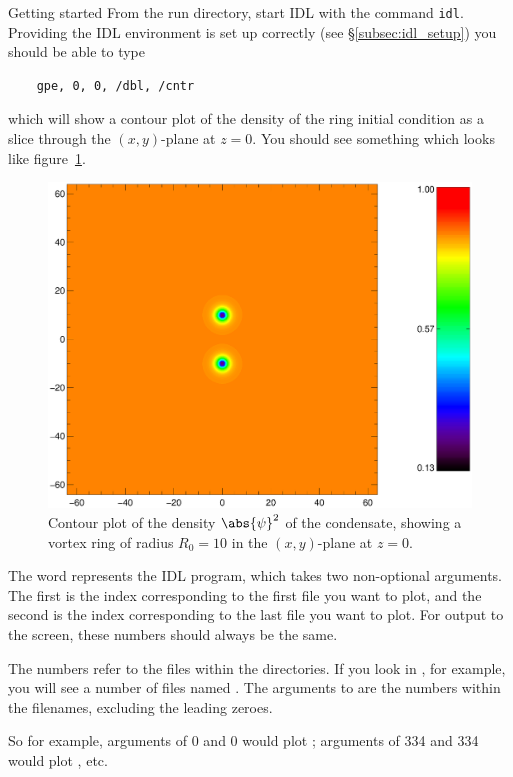 \begin{chapter}{\label{cha:quickstart}Getting started}
  From the run directory, start IDL with the command \verb"idl".  Providing the
  IDL environment is set up correctly (see \S\ref{subsec:idl_setup}) you
  should be able to type
  \begin{Verbatim}
    gpe, 0, 0, /dbl, /cntr
  \end{Verbatim}
  which will show a contour plot of the density of the ring initial condition
  as a slice through the $(x,y)$-plane at $z=0$.  You should see something
  which looks like figure~\ref{fig:ring_ic_con}.
  \begin{figure}[h]
    \centering
    \includegraphics[scale=0.5]{fig/ring_ic_con}
    \caption{\label{fig:ring_ic_con}Contour plot of the density
      $\abs{\psi}^{2}$ of the condensate, showing a vortex ring of radius
      $R_{0}=10$ in the $(x,y)$-plane at $z=0$.}
  \end{figure}
  
  The word  represents the IDL program, which takes two
  non-optional arguments.  The first is the index corresponding to the first
  file you want to plot, and the second is the index corresponding to the last
  file you want to plot.  For output to the screen, these numbers should always
  be the same.

  The numbers refer to the files within the  directories.  If you
  look in , for example, you will see a number of files named
  .  The arguments to  are the numbers
  within the filenames, excluding the leading zeroes.

  So for example, arguments of 0 and 0 would plot ;
  arguments of 334 and 334 would plot , etc.


\end{chapter}
